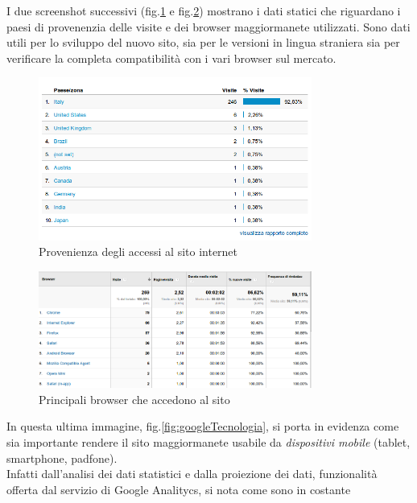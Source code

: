 \documentclass[a4paper,12pt,hidelinks]{report}
\begin{document}
  \par I due screenshot successivi (fig.\ref{fig:googleAnalyticsPaesi} e fig.\ref{fig:googleAnalyticsBrowser}) mostrano i dati statici che riguardano i paesi di provenenzia
  delle visite e dei browser maggiormanete utilizzati. Sono dati utili per lo sviluppo del nuovo sito, sia per le versioni in lingua straniera sia per verificare
  la completa compatibilità con i vari browser sul mercato.
  \begin{figure}[h!]%
    \includegraphics[width=0.80\textwidth,keepaspectratio=true]{img/googleAnalyticsPaesi}
    \centering
    \caption{Provenienza degli accessi al sito internet}%
    \label{fig:googleAnalyticsPaesi}%
  \end{figure}
  \begin{figure}[h!]%
    \includegraphics[width=0.80\textwidth,keepaspectratio=true]{img/googleAnalyticsBrowser}
    \centering
    \caption{Principali browser che accedono al sito}%
    \label{fig:googleAnalyticsBrowser}%
  \end{figure}
  \par In questa ultima immagine, fig.\ref{fig:googleTecnologia}, si porta in evidenza come sia importante rendere il sito maggiormanete usabile da \textit{dispositivi mobile} (tablet, smartphone,
  padfone). 
  \\Infatti dall'analisi dei dati statistici e dalla proiezione dei dati, funzionalità offerta dal servizio di Google Analitycs, si nota come sono in costante 
\end{document}

